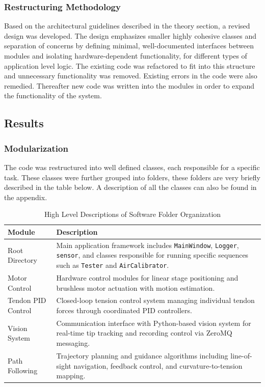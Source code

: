 \subsubsection{Restructuring Methodology}
Based on the architectural guidelines described in the theory section, a revised design was developed. The design emphasizes smaller highly cohesive classes and separation of concerns by defining minimal, well-documented interfaces between modules and isolating hardware-dependent functionality, for different types of application level logic. The existing code was refactored to fit into this structure and unnecessary functionality was removed. Existing errors in the code were also remedied. Thereafter new code was written into the modules in order to expand the functionality of the system.

\subsection{Results}

\subsubsection{Modularization}
The code was restructured into well defined classes, each responsible for a specific task. These classes were further grouped into folders, these folders are very briefly described in the table below. A description of all the classes can also be found in the appendix. 

\begin{table}[htbp]
\centering
\caption{High Level Descriptions of Software Folder Organization}
\begin{tabular}{p{}p{}}
\toprule
\textbf{Module} & \textbf{Description} \\
\midrule
Root Directory & Main application framework includes \texttt{MainWindow}, \texttt{Logger}, \texttt{sensor}, and classes responsible for running specific sequences such as \texttt{Tester} and \texttt{AirCalibrator}. \\
\addlinespace
Motor Control & Hardware control modules for linear stage positioning and brushless motor actuation with motion estimation. \\
\addlinespace
Tendon PID Control & Closed-loop tension control system managing individual tendon forces through coordinated PID controllers. \\
\addlinespace
Vision System & Communication interface with Python-based vision system for real-time tip tracking and recording control via ZeroMQ messaging. \\
\addlinespace
Path Following & Trajectory planning and guidance algorithms including line-of-sight navigation, feedback control, and curvature-to-tension mapping. \\
\bottomrule
\end{tabular}
\end{table}


